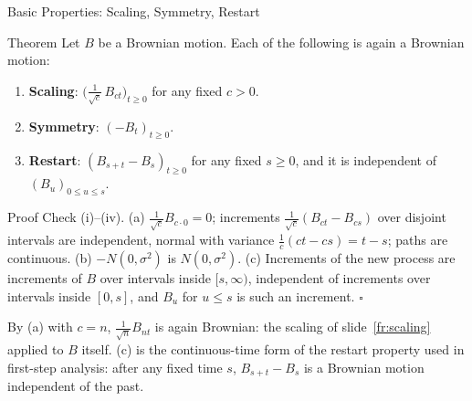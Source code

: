 \begin{frame}{Basic Properties: Scaling, Symmetry, Restart}
  \label{fr:bmscaling}
  \small
  \begin{block}{Theorem}
    Let $B$ be a Brownian motion. Each of the following is again a Brownian motion:
    \begin{enumerate}
      \item[(a)] \textbf{Scaling}: $\big(\tfrac{1}{\sqrt c}\,B_{ct}\big)_{t\ge0}$ for any fixed $c>0$.
      \item[(b)] \textbf{Symmetry}: $(-B_t)_{t\ge0}$.
      \item[(c)] \textbf{Restart}: $(B_{s+t}-B_s)_{t\ge0}$ for any fixed $s\ge0$, and it is independent of $(B_u)_{0\le u\le s}$.
    \end{enumerate}
  \end{block}
  \begin{block}{Proof}
    Check (i)--(iv). (a) $\tfrac1{\sqrt c}B_{c\cdot0}=0$; increments $\tfrac1{\sqrt c}(B_{ct}-B_{cs})$ over disjoint intervals are independent, normal with variance $\tfrac1c(ct-cs)=t-s$; paths are continuous. (b) $-N(0,\sigma^2)$ is $N(0,\sigma^2)$. (c) Increments of the new process are increments of $B$ over intervals inside $[s,\infty)$, independent of increments over intervals inside $[0,s]$, and $B_u$ for $u\le s$ is such an increment. \hfill$\square$
  \end{block}
  \smallskip
  By (a) with $c=n$, $\tfrac1{\sqrt n}B_{nt}$ is again Brownian: the scaling of slide~\ref{fr:scaling} applied to $B$ itself.
  (c) is the continuous-time form of the restart property used in first-step analysis: after any fixed time $s$, $B_{s+t}-B_s$ is a Brownian motion independent of the past.
\end{frame}

